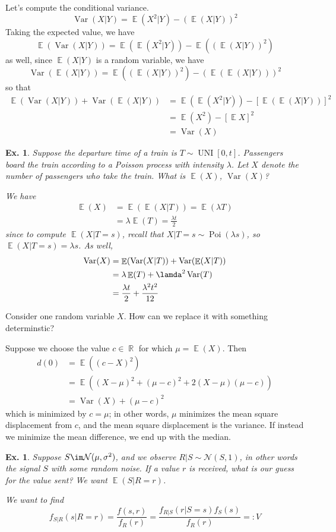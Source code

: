 \documentclass[12pt, a4paper]{book}
\DeclareMathOperator{\R}{\mathbb{R}}
\DeclareMathOperator{\E}{\mathbb{E}}
\DeclareMathOperator{\Var}{Var}
\DeclareMathOperator{\Poi}{Poi}
\DeclareMathOperator{\UNI}{UNI}
\newtheorem{example}[theorem]{Ex.}
\theoremstyle{nonumberplain}
\begin{document}
Let's compute the conditional variance.
\[\Var(X|Y)=\E(X^2|Y)-(\E(X|Y))^2\]
Taking the expected value, we have
\[\E(\Var(X|Y))=\E(\E(X^2|Y))-\E((\E(X|Y))^2)\]
as well, since $\E(X|Y)$ is a random variable, we have
\[\Var(\E(X|Y))=\E((\E(X|Y))^2)-(\E(\E(X|Y)))^2\]
so that
\begin{align*}
    \E(\Var(X|Y))+\Var(\E(X|Y)) &= \E(\E(X^2|Y))-[\E(\E(X|Y))]^2\\
                                &= \E(X^2)-[\E X]^2\\
                                &= \Var(X)
\end{align*}
\begin{example}
    Suppose the departure time of a train is $T\sim\UNI[0,t]$.
    Passengers board the train according to a Poisson process with intensity $\lambda$.
    Let $X$ denote the number of passengers who take the train.
    What is $\E(X)$, $\Var(X)$?

    We have
    \begin{align*}
        \E(X) &= \E(\E(X|T))=\E(\lambda T)\\
              &= \lambda \E(T)=\frac{\lambda t}{2}
    \end{align*}
    since to compute $\E(X|T=s)$, recall that $X|T=s\sim\Poi(\lambda s)$, so $\E(X|T=s)=\lambda s$.
    As well,
    \begin{align*}
        \Var(X) &= \E(\Var(X|T))+\Var(\E(X|T))\\
                &= \lambda\E(T)+\lamda^2\Var(T)\\
                &= \frac{\lambda t}{2}+\frac{\lambda^2 t^2}{12}
    \end{align*}
\end{example}
Consider one random variable $X$.
How can we replace it with something determinstic?

Suppose we choose the value $c\in\R$ for which $\mu=\E(X)$.
Then
\begin{align*}
    d(0) &= \E((c-X)^2)\\
         &= \E((X-\mu)^2+(\mu-c)^2+2(X-\mu)(\mu-c))\\
         &= \Var(X) + (\mu-c)^2
\end{align*}
which is minimized by $c=\mu$; in other words, $\mu$ minimizes the mean square displacement from $c$, and the mean square displacement is the variance.
If instead we minimize the mean difference, we end up with the median.
\begin{example}
    Suppose $S\im\mathcal{N}(\mu,\sigma^2)$, and we observe $R|S\sim\mathcal{N}(S,1)$, in other words the signal $S$ with some random noise.
    If a value $r$ is received, what is our guess for the value sent?
    We want $\E(S|R=r)$.

    We want to find
    \[f_{S|R}(s|R=r)=\frac{f(s,r)}{f_R(r)}=\frac{f_{R|S}(r|S=s)f_S(s)}{f_R(r)}=: V\]
\end{example}
\end{document}
